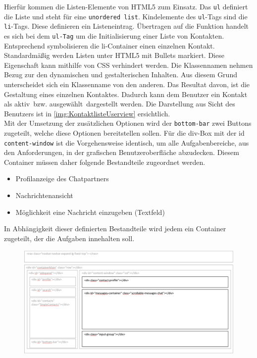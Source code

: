 \documentclass[a4paper,titlepage,halfparskip,12pt]{scrreprt}
\begin{document}
\begin{onehalfspacing}
\begin{figure}[h]
\end{figure}
Hierfür kommen die Listen-Elemente von HTML5 zum Einsatz. Das \texttt{ul} definiert die Liste und steht für eine \texttt{unordered list}. Kindelemente des \texttt{ul}-Tags sind die \texttt{li}-Tags. Diese definieren ein Listeneintrag.
Übertragen auf die Funktion handelt es sich bei dem \texttt{ul-Tag} um die Initialisierung einer Liste von Kontakten. Entsprechend symbolisieren die li-Container einen einzelnen Kontakt. Standardmäßig werden Listen unter HTML5 mit Bullets markiert. Diese Eigenschaft kann mithilfe von CSS verhindert werden. Die Klassennamen nehmen Bezug zur den dynamischen und gestalterischen Inhalten. Aus diesem Grund unterscheidet sich ein Klassenname von den anderen. Das Resultat davon, ist die Gestaltung eines einzelnen Kontaktes. Dadurch kann dem Benutzer ein Kontakt als \glqq aktiv\grqq\ bzw. \glqq ausgewählt\grqq\ dargestellt werden. Die Darstellung aus Sicht des Benutzers ist in \autoref{img:KontaktlisteUserview} ersichtlich. \cite{w3schoolsUlTag}\\
Mit der Umsetzung der zusätzlichen Optionen wird der \texttt{bottom-bar} zwei Buttons zugeteilt, welche diese Optionen bereitstellen sollen. Für die div-Box mit der id \texttt{content-window} ist die Vorgehensweise identisch, um alle Aufgabenbereiche, aus den Anforderungen, in der grafischen Benutzeroberfläche abzudecken. Diesem Container müssen daher folgende Bestandteile zugeordnet werden.
\begin{itemize}
	\item Profilanzeige des Chatpartners
	\item Nachrichtenansicht
	\item Möglichkeit eine Nachricht einzugeben (Textfeld)
\end{itemize}
In Abhängigkeit dieser definierten Bestandteile wird jedem ein Container zugeteilt, der die Aufgaben innehalten soll.
\begin{figure}[h]
	\centering
	\includegraphics[scale=0.60]{images/BasisStruktur1GochatContentWindow}

\end{figure}
\end{onehalfspacing}
\end{document}

